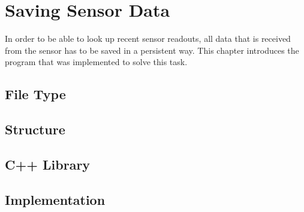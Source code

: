 \chapter{Saving Sensor Data}
\label{ch:faps-save}

\author{Nico Kratky}
%

In order to be able to look up recent sensor readouts, all data that is received from the sensor has to be saved in a persistent way. This chapter introduces the program that was implemented to solve this task.

\section{File Type}


\section{Structure}


\section {C++ Library}


\section{Implementation}

